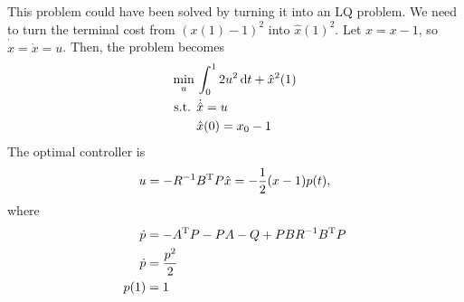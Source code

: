 This problem could have been solved by turning it into an LQ problem. We need to turn the terminal cost from $(x(1)-1)^2$ into $\hat x(1)^2$. Let $\hat x=x-1$, so $\dot{\hat x}=\dot x=u$. Then, the problem becomes
\begin{align}
  \min_u {} & \int_0^1 2u^2\mathop{}\!\mathrm{d} t + \hat x^2(1) \\
  \text{s.t. } & \dot{\hat x}=u \\
            & \hat x(0) = x_0 - 1
\end{align}
The optimal controller is
\begin{gather}
  u = -R^{-1} B^\text{T} P \hat x = -\frac12 (x-1) p(t),
\end{gather}
where
\begin{align}
  \dot p &= -A^\text{T} P - PA - Q + PBR^{-1}B^\text{T} P \\
  \dot p &= \frac{p^2}{2} \\
  p(1) &= 1
\end{align}


